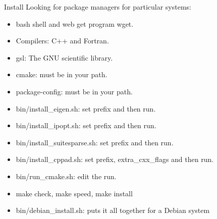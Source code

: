 \documentclass{beamer}
\begin{document}
\begin{frame}{Install}
Looking for package managers for particular systems:
\pause

\begin{itemize}

\item
bash shell and web get program wget.
\pause

\item
Compilers: C++ and Fortran.
\pause

\item
gsl: The GNU scientific library.
\pause

\item
cmake: must be in your path.
\pause

\item
package-config: must be in your path.
\pause

\item
bin/install\_eigen.sh: set prefix and then run.
\pause

\item
bin/install\_ipopt.sh: set prefix and then run.
\pause

\item
bin/install\_suitesparse.sh: set prefix and then run.
\pause

\item
bin/install\_cppad.sh: set prefix, extra\_cxx\_flags and then run.
\pause

\item
bin/run\_cmake.sh: edit the run.
\pause

\item
make check, make speed, make install
\pause

\item
bin/debian\_install.sh: puts it all together for a Debian system
\pause

\end{itemize}
\end{frame}
\end{document}
